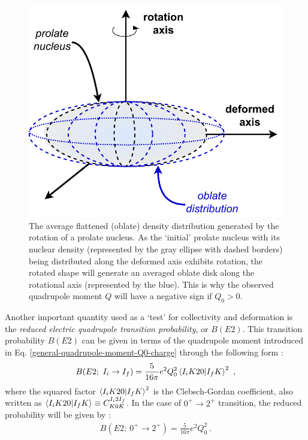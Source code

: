\begin{figure}
    \centering
    \includegraphics[scale=0.7]{Chapters/Figures/averaged_nuclearMatter_prolate.pdf}
    \caption{The average flattened (oblate) density distribution generated by the rotation of a prolate nucleus. As the `initial' prolate nucleus with its nuclear density (represented by the gray ellipse with dashed borders) being distributed along the deformed axis exhibits rotation, the rotated shape will generate an averaged oblate disk along the rotational axis (represented by the blue). This is why the observed quadrupole moment $Q$ will have a negative sign if $Q_0>0$.}
    \label{fig-averaged-prolate-density}
\end{figure}

Another important quantity used as a `test' for collectivity and deformation is the \emph{reduced electric quadrupole transition probability}, or $B(E2)$. This transition probability $B(E2)$ can be given in terms of the quadrupole moment introduced in Eq. \ref{general-quadrupole-moment-Q0-charge} through the following form \cite{bohr1998nuclear}:
\begin{align}
    B(E2;\ I_i\to I_f)=\frac{5}{16\pi}e^2Q_0^2\bra{I_iK20}\ket{I_fK}^2\ ,
    \label{reduced-E2-clebsch-gordan}
\end{align}
where the squared factor $\bra{I_iK20}\ket{I_fK}^2$ is the Clebsch-Gordan coefficient, also written as $\bra{I_iK20}\ket{I_fK}\equiv C^{I_i2I_f}_{K0K}$. In the case of $0^+\to 2^+$ transition, the reduced probability will be given by \cite{casten2000nuclear}:
\begin{align}
    B(E2;\ 0^+\to 2^+)=\frac{5}{16\pi}e^2Q_0^2\ .
    \label{reduced-E2-0Plus-2Plus-Transition}
\end{align}

